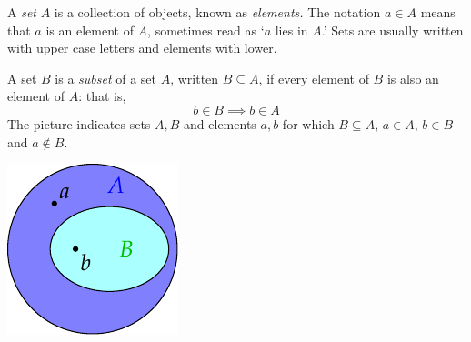 \begin{defn}{}{}
	A \emph{set} $A$ is a collection of objects, known as \emph{elements.}\footnotemark{} The notation $a\in A$ means that $a$ is an element of $A$, sometimes read as `$a$ lies in $A$.' Sets are usually written with upper case letters and elements with lower.\par
	\begin{minipage}[t]{0.75\linewidth}\vspace{0pt}
		A set $B$ is a \emph{subset} of a set $A$, written $B\subseteq A$, if every element of $B$ is also an element of $A$: that is,
		\[
			b\in B\implies b\in A
		\]
		The picture indicates sets $A,B$ and elements $a,b$ for which $B\subseteq A$, $a\in A$, $b\in B$ and $a\notin B$.
	\end{minipage}
	\hfill
	\begin{minipage}[t]{0.24\linewidth}\vspace{-12pt}
		\flushright
		\includegraphics[scale=0.95]{functions-subset}
	\end{minipage}
\end{defn}



